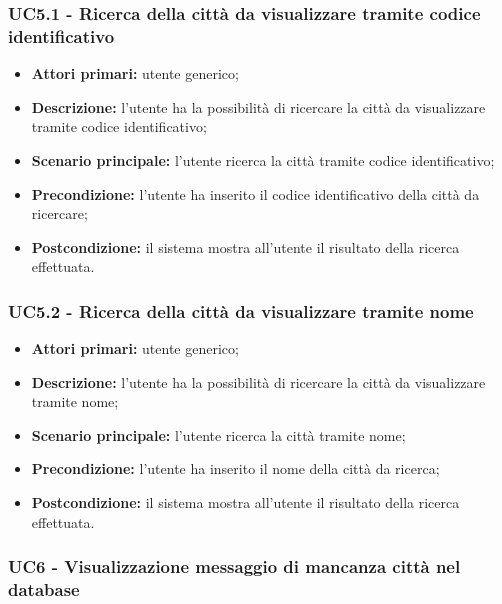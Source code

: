 \subsubsection{UC5.1 - Ricerca della città da visualizzare tramite codice identificativo}\label{CasiDUsoCasiDUsoTraUnUtenteEIlFrontEndElencoCasiDUsoUC51RicercaDellaCittàDaVisualizzareTramiteCodiceIdentificativo}

\begin{itemize}
	\item \textbf{Attori primari:} utente generico;
	\item \textbf{Descrizione:} l’utente ha la possibilità di ricercare la città da visualizzare tramite codice identificativo;
	\item \textbf{Scenario principale:} l’utente ricerca la città tramite codice identificativo;
	\item \textbf{Precondizione:} l’utente ha inserito il codice identificativo della città da ricercare;
	\item \textbf{Postcondizione:} il sistema mostra all’utente il risultato della ricerca effettuata.
\end{itemize}

\subsubsection{UC5.2 - Ricerca della città da visualizzare tramite nome}\label{CasiDUsoCasiDUsoTraUnUtenteEIlFrontEndElencoCasiDUsoUC52RicercaDellaCittàDaVisualizzareTramiteNome}

\begin{itemize}
	\item \textbf{Attori primari:} utente generico;
	\item \textbf{Descrizione:} l’utente ha la possibilità di ricercare la città da visualizzare tramite nome;
	\item \textbf{Scenario principale:} l’utente ricerca la città tramite nome;
	\item \textbf{Precondizione:} l’utente ha inserito il nome della città da ricerca;
	\item \textbf{Postcondizione:} il sistema mostra all’utente il risultato della ricerca effettuata.
\end{itemize}

\subsubsection{UC6 - Visualizzazione messaggio di mancanza città nel database}\label{CasiDUsoCasiDUsoTraUnUtenteEIlFrontEndElencoCasiDUsoUC6VisualizzazioneMessaggioDiMancanzaCittàNelDatabase}


